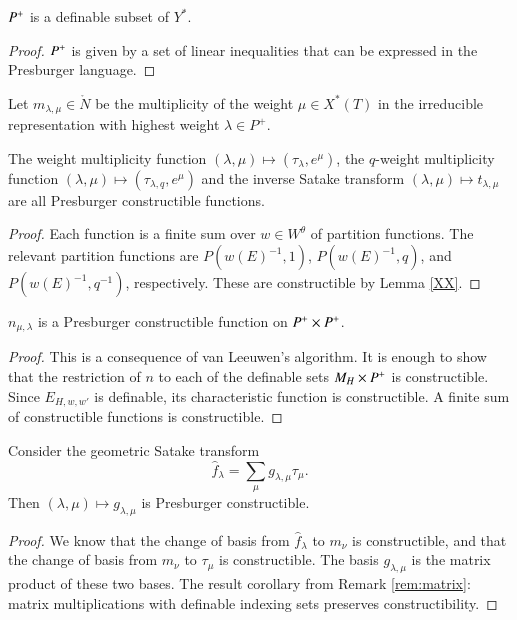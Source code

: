 \begin{lemma}
$P^+$ is a definable subset of $Y^*$.
\end{lemma}

\begin{proof}
$P^+$ is given by a set of linear inequalities that can be expressed in the Presburger language.
\end{proof}


Let $m_{\lambda,\mu}\in \ring{N}$ be the multiplicity of the weight $\mu\in X^*(T)$
in the irreducible representation with highest weight $\lambda\in P^+$.


\begin{lemma}  The weight multiplicity function $(\lambda,\mu)\mapsto (\tau_\lambda,e^\mu)$, the $q$-weight multiplicity
function $(\lambda,\mu)\mapsto (\tau_{\lambda,q},e^\mu)$  and the inverse Satake transform $(\lambda,\mu)\mapsto t_{\lambda,\mu}$
are all Presburger constructible functions.
\end{lemma}

\begin{proof} 
Each function is a finite sum over $w\in W^\theta$ of partition functions.  The relevant partition functions
are $P(w(E)^{-1},1)$, $P(w(E)^{-1},q)$, and $P(w(E)^{-1},q^{-1})$, respectively.  These are constructible
by Lemma \ref{XX}.
\end{proof}



\begin{theorem}\label{lemma:van-leeuwen} $n_{\mu,\lambda}$ is a Presburger constructible function on $P^+\times P^+$.
\end{theorem}

\begin{proof} This is a consequence of van Leeuwen's algorithm. 
It is enough to show that the restriction of $n$ to each of the definable sets
$M_H\times P^+$ is constructible.  
Since $E_{H,w,w'}$ is definable, its characteristic function is constructible.
A finite sum of constructible functions is constructible.
\end{proof}


\begin{corollary} Consider the geometric Satake transform
\[
\hat f_\lambda = \sum_\mu g_{\lambda,\mu} \tau_\mu.
\]
Then $(\lambda,\mu)\mapsto g_{\lambda,\mu}$ is Presburger constructible.
\end{corollary}

\begin{proof}  We know that the change of basis from $\hat f_\lambda$ to $m_\nu$ is constructible,
and that the change of basis from $m_\nu$ to $\tau_\mu$ is constructible.  The basis $g_{\lambda,\mu}$
is the matrix product of these two bases.  The result corollary from Remark \ref{rem:matrix}:
matrix multiplications with definable indexing sets preserves constructibility.
\end{proof}

